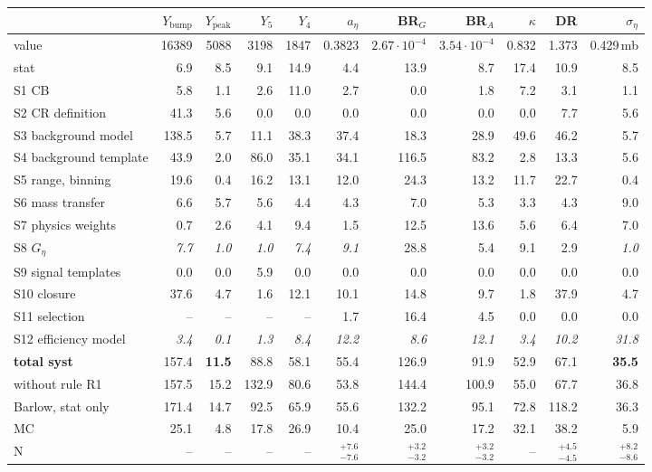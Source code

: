 \begin{tabular}{lrrrrrrrrrr}
\toprule
 & $Y_\mathrm{bump}$ & $Y_\mathrm{peak}$ & $Y_5$ & $Y_4$ & $a_\eta$ & BR$_G$ & BR$_A$ & $\kappa$ & DR & $\sigma_\eta$ \\
\midrule
value & 16389 & 5088 & 3198 & 1847 & 0.3823 & $2.67\cdot10^{-4}$ & $3.54\cdot10^{-4}$ & 0.832 & 1.373 & 0.429\,mb \\
stat & 6.9 & 8.5 & 9.1 & 14.9 & 4.4 & 13.9 & 8.7 & 17.4 & 10.9 & 8.5 \\
\midrule
S1 CB & 5.8 & 1.1 & 2.6 & 11.0 & 2.7 & 0.0 & 1.8 & 7.2 & 3.1 & 1.1 \\
S2 CR definition & 41.3 & 5.6 & 0.0 & 0.0 & 0.0 & 0.0 & 0.0 & 0.0 & 7.7 & 5.6 \\
S3 background model & 138.5 & 5.7 & 11.1 & 38.3 & 37.4 & 18.3 & 28.9 & 49.6 & 46.2 & 5.7 \\
S4 background template & 43.9 & 2.0 & 86.0 & 35.1 & 34.1 & 116.5 & 83.2 & 2.8 & 13.3 & 5.6 \\
S5 range, binning & 19.6 & 0.4 & 16.2 & 13.1 & 12.0 & 24.3 & 13.2 & 11.7 & 22.7 & 0.4 \\
S6 mass transfer & 6.6 & 5.7 & 5.6 & 4.4 & 4.3 & 7.0 & 5.3 & 3.3 & 4.3 & 9.0 \\
S7 physics weights & 0.7 & 2.6 & 4.1 & 9.4 & 1.5 & 12.5 & 13.6 & 5.6 & 6.4 & 7.0 \\
S8 $G_\eta$ & \textit{7.7} & \textit{1.0} & \textit{1.0} & \textit{7.4} & \textit{9.1} & 28.8 & 5.4 & 9.1 & 2.9 & \textit{1.0} \\
S9 signal templates & 0.0 & 0.0 & 5.9 & 0.0 & 0.0 & 0.0 & 0.0 & 0.0 & 0.0 & 0.0 \\
S10 closure & 37.6 & 4.7 & 1.6 & 12.1 & 10.1 & 14.8 & 9.7 & 1.8 & 37.9 & 4.7 \\
S11 selection & -- & -- & -- & -- & 1.7 & 16.4 & 4.5 & 0.0 & 0.0 & 0.0 \\
S12 efficiency model & \textit{3.4} & \textit{0.1} & \textit{1.3} & \textit{8.4} & \textit{12.2} & \textit{8.6} & \textit{12.1} & \textit{3.4} & \textit{10.2} & \textit{31.8} \\
\midrule
\textbf{total syst} & 157.4 & \textbf{11.5} & 88.8 & 58.1 & 55.4 & 126.9 & 91.9 & 52.9 & 67.1 & \textbf{35.5} \\
\quad without rule R1 & 157.5 & 15.2 & 132.9 & 80.6 & 53.8 & 144.4 & 100.9 & 55.0 & 67.7 & 36.8 \\
\quad Barlow, stat only & 171.4 & 14.7 & 92.5 & 65.9 & 55.6 & 132.2 & 95.1 & 72.8 & 118.2 & 36.3 \\
MC & 25.1 & 4.8 & 17.8 & 26.9 & 10.4 & 25.0 & 17.2 & 32.1 & 38.2 & 5.9 \\
N & -- & -- & -- & -- & $^{+7.6}_{-7.6}$ & $^{+3.2}_{-3.2}$ & $^{+3.2}_{-3.2}$ & -- & $^{+4.5}_{-4.5}$ & $^{+8.2}_{-8.6}$ \\
\bottomrule
\end{tabular}
